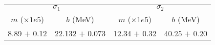 \begin{tabular}{cc|cc}
\multicolumn{2}{c|}{$\sigma_1$} & \multicolumn{2}{|c}{$\sigma_2$} \\
$m$ ($\times1e5$) & $b$ (MeV) & $m$ ($\times1e5$) & $b$ (MeV) \\
\hline
8.89 $\pm$ 0.12 & 22.132 $\pm$ 0.073 & 12.34 $\pm$ 0.32 & 40.25 $\pm$ 0.20\\
\end{tabular}
